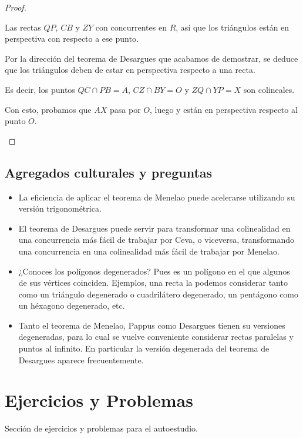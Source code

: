 \begin{proof}
\begin{multicols}{2}
        Las rectas $QP$, $CB$ y $ZY$ con concurrentes en $R$, así que los triángulos están en perspectiva con respecto a ese punto.

        Por la dirección del teorema de Desargues que acabamos de demostrar, se deduce que los triángulos deben de estar en perspectiva respecto a una recta.

        Es decir, los puntos $QC \cap PB = A$, $CZ \cap BY = O$ y $ZQ \cap YP = X$ son colineales.

        Con esto, probamos que $AX$ pasa por $O$, luego  y  están en perspectiva respecto al punto $O$. \qedhere
    \end{multicols}
\end{proof}




\subsection{Agregados culturales y preguntas}

\begin{itemize}
    \item La eficiencia de aplicar el teorema de Menelao puede acelerarse utilizando su versión trigonométrica.
    \item El teorema de Desargues puede servir para transformar una colinealidad en una concurrencia más fácil de trabajar por Ceva, o viceversa, transformando una concurrencia en una colinealidad más fácil de trabajar por Menelao.
    \item ¿Conoces los polígonos degenerados?
    Pues es un polígono en el que algunos de sus vértices coinciden.
    Ejemplos, una recta la podemos considerar tanto como un triángulo degenerado o cuadrilátero degenerado, un pentágono como un héxagono degenerado, etc.
    \item Tanto el teorema de Menelao, Pappus como Desargues tienen su versiones degeneradas, para lo cual se vuelve conveniente considerar rectas paralelas y puntos al infinito.
    En particular la versión degenerada del teorema de Desargues aparece frecuentemente.
\end{itemize}




\section{Ejercicios y Problemas}

Sección de ejercicios y problemas para el autoestudio.

